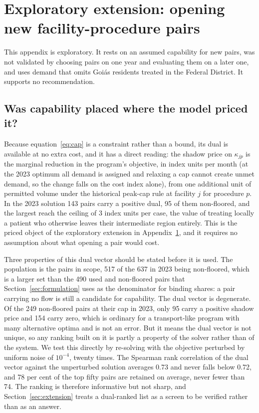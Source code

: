 \appendix
\section{Exploratory extension: opening new facility-procedure pairs}
\label{app:explore}

This appendix is exploratory. It rests on an assumed capability for new pairs, was not validated by choosing pairs on one year and evaluating them on a later one, and uses demand that omits Goi\'as residents treated in the Federal District. It supports no recommendation.

\subsection{Was capability placed where the model priced it?}
\label{sec:placement}

Because equation~\eqref{eq:cap} is a constraint rather than a bound, its dual is
available at no extra cost, and it has a direct reading: the shadow price on
$\kappa_{jp}$ is the marginal reduction in the program's objective, in index units per
month (at the 2023 optimum all demand is assigned and relaxing a cap cannot create unmet demand, so the change falls on the cost index alone), from one additional unit of permitted volume under the historical peak-cap rule at facility $j$ for
procedure $p$. In the 2023 solution 143 pairs carry a positive dual, 95 of them
non-floored, and the largest reach the ceiling of 3 index units per case,
the value of treating locally a patient who otherwise leaves their intermediate
region entirely. This is the priced object of the exploratory extension in Appendix~\ref{app:explore}, and it
requires no assumption about what opening a pair would cost.

Three properties of this dual vector should be stated before it is used. The
population is the pairs in scope, 517 of the 637 in 2023 being non-floored, which
is a larger set than the 490 used and non-floored pairs that Section~\ref{sec:formulation}
uses as the denominator for binding shares: a pair carrying no flow is still a
candidate for capability. The dual vector is degenerate. Of the 249 non-floored
pairs at their cap in 2023, only 95 carry a positive shadow price and 154 carry
zero, which is ordinary for a transport-like program with many alternative optima
and is not an error. But it means the dual vector is not unique, so any ranking
built on it is partly a property of the solver rather than of the system. We test
this directly by re-solving with the objective perturbed by uniform noise of
$10^{-4}$, twenty times. The Spearman rank correlation of the dual vector against
the unperturbed solution averages 0.73 and never falls below 0.72, and 78 per cent
of the top fifty pairs are retained on average, never fewer than 74. The ranking
is therefore informative but not sharp, and Section~\ref{sec:extension} treats a
dual-ranked list as a screen to be verified rather than as an answer.

